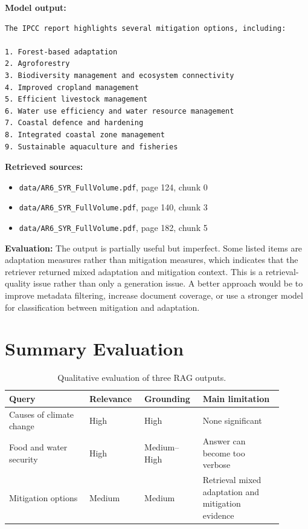 \documentclass[11pt,a4paper]{article}
\begin{document}
\textbf{Model output:}
\begin{lstlisting}
The IPCC report highlights several mitigation options, including:

1. Forest-based adaptation
2. Agroforestry
3. Biodiversity management and ecosystem connectivity
4. Improved cropland management
5. Efficient livestock management
6. Water use efficiency and water resource management
7. Coastal defence and hardening
8. Integrated coastal zone management
9. Sustainable aquaculture and fisheries
\end{lstlisting}

\textbf{Retrieved sources:}
\begin{itemize}
    \item \texttt{data/AR6\_SYR\_FullVolume.pdf}, page 124, chunk 0
    \item \texttt{data/AR6\_SYR\_FullVolume.pdf}, page 140, chunk 3
    \item \texttt{data/AR6\_SYR\_FullVolume.pdf}, page 182, chunk 5
\end{itemize}

\textbf{Evaluation:} The output is partially useful but imperfect. Some listed items are adaptation measures rather than mitigation measures, which indicates that the retriever returned mixed adaptation and mitigation context. This is a retrieval-quality issue rather than only a generation issue. A better approach would be to improve metadata filtering, increase document coverage, or use a stronger model for classification between mitigation and adaptation.

\section{Summary Evaluation}

\begin{table}[h]
\centering
\begin{tabular}{p{0.27\linewidth}p{0.18\linewidth}p{0.18\linewidth}p{0.27\linewidth}}
\toprule
Query & Relevance & Grounding & Main limitation \\
\midrule
Causes of climate change & High & High & None significant \\
Food and water security & High & Medium--High & Answer can become too verbose \\
Mitigation options & Medium & Medium & Retrieval mixed adaptation and mitigation evidence \\
\bottomrule
\end{tabular}
\caption{Qualitative evaluation of three RAG outputs.}
\end{table}
\end{document}
